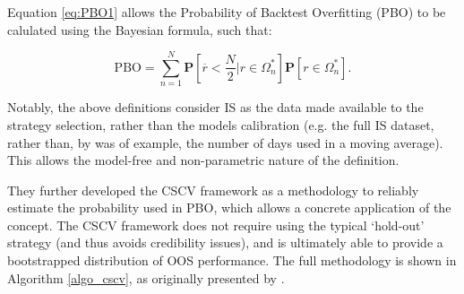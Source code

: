 \documentclass[a4paper,11pt,oneside]{article}
\theoremstyle{plain}
\theoremstyle{definition}
\begin{document}
	Equation \ref{eq:PBO1} allows the Probability of Backtest Overfitting (PBO) to be calulated using the Bayesian formula, such that:
	
	\begin{equation}\label{eq:PBO2}
	\mathrm{PBO} = \sum_{n=1}^{N}\mathbf{P}[\overline{r} < {\frac{N}{2}}|r\in\Omega_{n}^{*}]\mathbf{P}[r\in\Omega_{n}^{*}] .
	\end{equation}
	
	Notably, the above definitions consider IS as the data made available to the strategy selection, rather than the 
	models calibration (e.g. the full IS dataset, rather than, by was of example, the number of days used in a moving average). 
	This allows the model-free and non-parametric nature of the definition. 
	\hfill \break 
	
	They further developed the CSCV framework as a methodology to reliably estimate the probability used in PBO, which allows a concrete application of the concept. The CSCV framework does not require using the typical ‘hold-out’ strategy (and thus avoids credibility issues), and is ultimately able to provide a bootstrapped distribution of OOS performance. The full methodology is shown in Algorithm \ref{algo_cscv}, as originally presented by \citet{BailyPBO}.
	\hfill \break 
	
\end{document}
